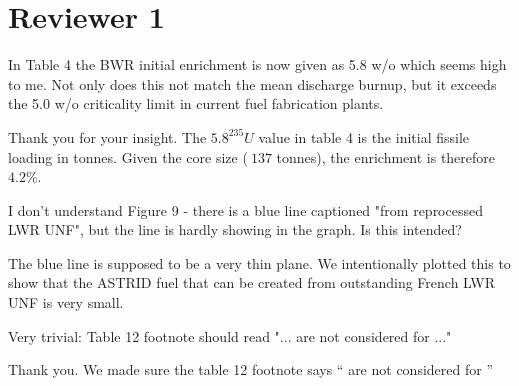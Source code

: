 \documentclass[answers,11pt]{exam}
\begin{document}
\section*{Reviewer 1}
\begin{questions}
    \question In Table 4 the BWR initial enrichment is now given as 5.8 w/o which seems high to me. Not only does this not match the mean discharge burnup, but it exceeds the 5.0 w/o criticality limit in current fuel fabrication plants. 

    \begin{solution}
    Thank you for your insight. The $5.8 ^{235}U$ value in table 4
    is the initial fissile loading in tonnes. Given the core size
    ($~137$ tonnes), the enrichment is therefore $4.2\%$.
    \end{solution}


    \question I don't understand Figure 9 - there is a blue line captioned "from reprocessed LWR UNF", but the line is hardly showing in the graph. Is this intended?

    \begin{solution}
    The blue line is supposed to be a very thin plane. We intentionally
    plotted this to show that the ASTRID fuel that can be created
    from outstanding French \gls{LWR} \gls{UNF} is very small.
    \end{solution}

    \question Very trivial: Table 12 footnote should read "... are not considered for ..."

    \begin{solution}
        Thank you. We made sure the table 12 footnote says `` are not considered for ''
    \end{solution}


\end{questions}
\end{document}
